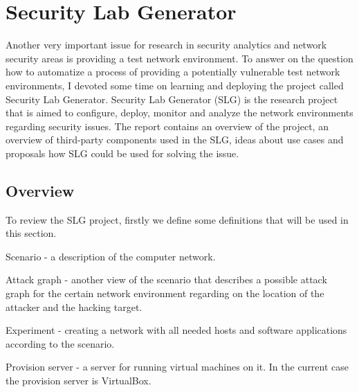 %


\section{Security Lab Generator}
Another very important issue for research in security analytics and network security areas is providing a test network environment. To answer on the question how to automatize a process of providing a potentially vulnerable test network environments, I devoted some time on learning and deploying the project called Security Lab Generator. Security Lab Generator (SLG) is the research project that is aimed to configure, deploy, monitor and analyze the network environments regarding security issues. The report contains an overview of the project, an overview of third-party components used in the SLG, ideas about use cases and proposals how SLG could be used for solving the issue.

\subsection{Overview}

To review the SLG project, firstly we define some definitions that will be used in this section. 

\begin{compactitem}
\item Scenario - a description of the computer network. 
\item Attack graph - another view of the scenario that describes a possible attack graph for the certain network environment regarding on the location of the attacker and the hacking target.   
\item Experiment - creating a network with all needed hosts and software applications according to the scenario.
\item Provision server - a server for running virtual machines on it. In the current case the provision server  is VirtualBox.
\end{compactitem}

